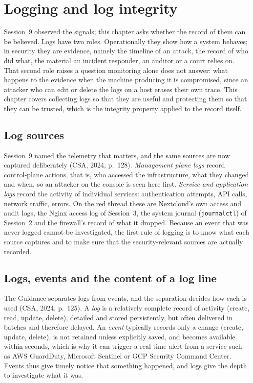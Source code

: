 \chapter{Logging and log integrity}

Session~9 observed the signals; this chapter asks whether the record of
them can be believed. Logs have two roles. Operationally they show how a
system behaves; in security they are evidence, namely the timeline of an
attack, the record of who did what, the material an incident responder, an
auditor or a court relies on. That second role raises a question monitoring
alone does not answer: what happens to the evidence when the machine
producing it is compromised, since an attacker who can edit or delete the
logs on a host erases their own trace. This chapter covers collecting logs
so that they are useful and protecting them so that they can be trusted,
which is the integrity property applied to the record itself.

\section{Log sources}

Session~9 named the telemetry that matters, and the same sources are now
captured deliberately (CSA, 2024, p.~128). \emph{Management plane logs}
record control-plane actions, that is, who accessed the infrastructure,
what they changed and when, so an attacker on the console is seen here
first. \emph{Service and application logs} record the activity of
individual services: authentication attempts, API calls, network traffic,
errors. On the red thread these are Nextcloud's own access and audit logs,
the Nginx access log of Session~3, the system journal (\texttt{journalctl})
of Session~2 and the firewall's record of what it dropped. Because an event
that was never logged cannot be investigated, the first rule of logging is
to know what each source captures and to make sure that the
security-relevant sources are actually recorded.

\section{Logs, events and the content of a log line}

The Guidance separates logs from events, and the separation decides how
each is used (CSA, 2024, p.~125). A \emph{log} is a relatively complete
record of activity (create, read, update, delete), detailed and stored
persistently, but often delivered in batches and therefore delayed. An
\emph{event} typically records only a change (create, update, delete), is
not retained unless explicitly saved, and becomes available within seconds,
which is why it can trigger a real-time alert from a service such as AWS
GuardDuty, Microsoft Sentinel or GCP Security Command Center. Events thus
give timely notice that something happened, and logs give the depth to
investigate what it was.

